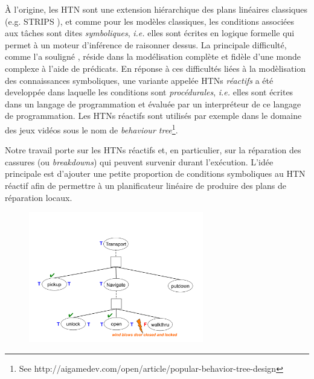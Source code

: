 \documentclass[a4paper,twoside,french]{article}
\begin{document}
		\par \`A l'origine, les HTN sont une extension hi\'erarchique des plans lin\'eaires classiques (e.g. STRIPS \cite{fikes1972strips}), et comme pour les modèles classiques, les conditions associ\'ees aux t\^aches sont dites \textit{symboliques}, \emph{i.e.} elles sont \'ecrites en logique formelle qui permet à un moteur d'inf\'erence de raisonner dessus. La principale difficulté, comme l'a souligné \cite{gil1992acquiring}, réside dans la modélisation complète et fidèle d'une monde complexe à l'aide de prédicats. En r\'eponse à ces difficult\'es li\'ees \`a la mod\`elisation des connaissances symboliques, une variante appel\'ee HTNs \textit{réactifs} a \'et\'e developp\'ee dans laquelle les conditions sont \textit{proc\'edurales}, \emph{i.e.} elles sont \'ecrites dans un langage de programmation et \'evalu\'ee par un interpr\'eteur de ce langage de programmation. Les HTNs réactifs sont utilis\'es par exemple dans le domaine des jeux vid\'eos sous le nom de \emph{behaviour tree}\footnote{See http://aigamedev.com/open/article/popular-behavior-tree-design}.	
		\par Notre travail porte sur les HTNs réactifs et, en particulier, sur la réparation des cassures (ou \emph{breakdowns}) qui peuvent survenir durant l'exécution. L'idée principale est d'ajouter une petite proportion de conditions symboliques au HTN réactif afin de permettre à un planificateur linéaire de produire des plans de réparation locaux.
				\begin{figure}[t]
					\centerline{\includegraphics[width=3in]{figs/wind}}
					\vskip 8pt
				\end{figure}
\end{document}
